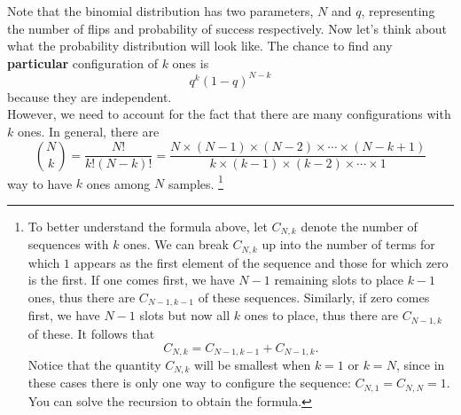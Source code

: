  Note that the binomial distribution has two parameters, $N$ and $q$, representing the number of flips and probability of success respectively. 
 Now let's think about what the probability distribution will look like. The chance to find any {\bf particular} configuration of $k$ ones is 
\begin{equation*}
q^k(1-q)^{N-k}
\end{equation*}
 because they are independent. \\
 
 \noindent
However, we need to account for the fact that there are many configurations with $k$ ones. In general, there are 
\begin{equation*}
{N \choose k} = \frac{N!}{k!(N-k)!} = \frac{N \times (N-1) \times (N-2) \times \cdots \times (N-k+1)}{k \times (k-1) \times (k-2) \times \cdots \times 1}
\end{equation*}
way to have $k$ ones among $N$ samples. 
\footnote{To better understand the formula above, let $C_{N,k}$ denote the number of sequences with $k$ ones. We can break $C_{N,k}$ up into the number of terms for which $1$ appears as the first element of the sequence and those for which zero is the first. If one comes first, we have $N-1$ remaining slots to place $k-1$ ones, thus there are $C_{N-1,k-1}$ of these sequences. Similarly, if zero comes first, we have $N-1$ slots but now all $k$ ones to place, thus there are $C_{N-1,k}$ of these. It follows that 
\begin{equation*}
C_{N,k} = C_{N-1,k-1} + C_{N-1,k}. 
\end{equation*}
Notice that the quantity $C_{N,k}$ will be smallest when $k=1$ or $k=N$, since in these cases there is only one way to configure the sequence: $C_{N,1} = C_{N,N} = 1$.  You can solve the recursion to obtain the formula. }
%

